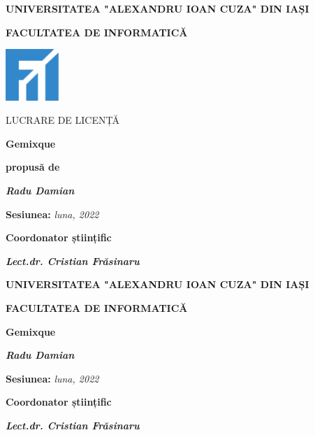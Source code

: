 \documentclass[12pt,a4paper]{report}
\begin{document}

\begin{titlepage}
	\centering
	{\scshape\large \textbf{UNIVERSITATEA "ALEXANDRU IOAN CUZA" DIN IAȘI} \par}
	\vspace{0.5cm}
	{\scshape\Large \textbf{FACULTATEA DE INFORMATICĂ}\par}
	\vspace{2cm}
	\includegraphics[width=0.15\textwidth]{logo-fii}\par\vspace{1cm}
	{\scshape\normalsize LUCRARE DE LICENȚĂ\par}
	\vspace{1cm}
	{\huge\bfseries Gemixque\par}
	\vspace{1.5cm}
	{\normalsize \textbf{propusă de}\par}
	\vspace{1cm}
	{\Large\itshape\textbf {Radu Damian}\par}
	\vspace{2cm}
	{\normalsize \textbf{Sesiunea:} \textit{luna, 2022}\par}
	\vspace{1cm}
	{\normalsize \textbf{Coordonator științific}\par}
	\vspace{0.5cm}
	{\Large\itshape\textbf {Lect.dr. Cristian Frăsinaru}\par}
\end{titlepage}

\begin{titlepage}
	\centering
	{\scshape\large \textbf{UNIVERSITATEA "ALEXANDRU IOAN CUZA" DIN IAȘI} \par}
	\vspace{0.5cm}
	{\scshape\Large \textbf{FACULTATEA DE INFORMATICĂ}\par}
	\vspace{5cm}


	{\huge\bfseries Gemixque\par}
	\vspace{3cm}
	{\Large\itshape\textbf {Radu Damian}\par}
	\vspace{2cm}
	{\normalsize \textbf{Sesiunea:} \textit{luna, 2022}\par}
	\vspace{4cm}
	{\normalsize \textbf{Coordonator științific}\par}
	\vspace{0.5cm}
	{\Large\itshape\textbf {Lect.dr. Cristian Frăsinaru}\par}
\end{titlepage}
\end{document}
